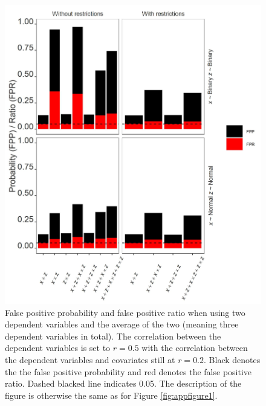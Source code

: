 \begin{landscape}
\scriptsize

\end{landscape}

\begin{figure}[hbt!]
\includegraphics{R/Analysis/Result/Figures/Figure3SI.jpeg}
\centering
\caption{False positive probability and false positive ratio when using two dependent variables and the average of the two (meaning three dependent variables in total). The correlation between the dependent variables is set to  $\textit{r}=0.5$ with the correlation between the dependent variables and covariates still at  $\textit{r}=0.2$. Black denotes the the false positive probability and red denotes the false positive ratio. Dashed blacked line indicates 0.05. The description of the figure is otherwise the same as for Figure \ref{fig:appfigure1}.}
\label{fig:appfigure3}
\end{figure}

\begin{landscape}
\scriptsize

\end{landscape}

